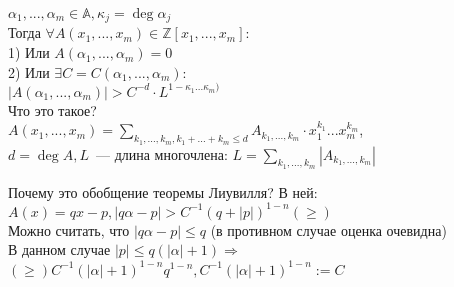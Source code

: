 
\begin{theorem}
$\alpha_1, ..., \alpha_m \in \mathbb{A}, \kappa_j = \deg\alpha_j$\\
Тогда $\forall A(x_1,...,x_m) \in \mathbb{Z}[x_1,...,x_m]$:\\
1) Или $A(\alpha_1, ... , \alpha_m) = 0$\\
2) Или $\exists C = C(\alpha_1, ..., \alpha_m)$:\\
$| A(\alpha_1,...,\alpha_m) | > C^{-d} \cdot L^{1 - \kappa_1...\kappa_m)}$\\
Что это такое?\\
$A(x_1,...,x_m) = \sum\limits_{k_1,...,k_m, k_1 + ... + k_m \leqslant d} A_{k_1,...,k_m}\cdot x_1^{k_1} ... x_m^{k_m}$,\\
$d = \deg A, L$~--- длина многочлена: $ L = \sum\limits_{k_1,...,k_m} | A_{k_1,...,k_m} |$
\end{theorem}
\begin{note}
Почему это обобщение теоремы Лиувилля? В ней:\\ $ A(x) = qx - p, |q\alpha - p| > C^{-1} (q + |p|)^{1-n} (\geqslant) $\\
Можно считать, что $|q\alpha - p| \leqslant q$ (в противном случае оценка очевидна)\\
В данном случае $|p| \leqslant q(|\alpha| + 1) \Rightarrow$\\
$(\geqslant) C^{-1} (|\alpha| + 1)^{1-n}q^{1-n}, C^{-1} (|\alpha| + 1)^{1-n} := C$
\end{note}
